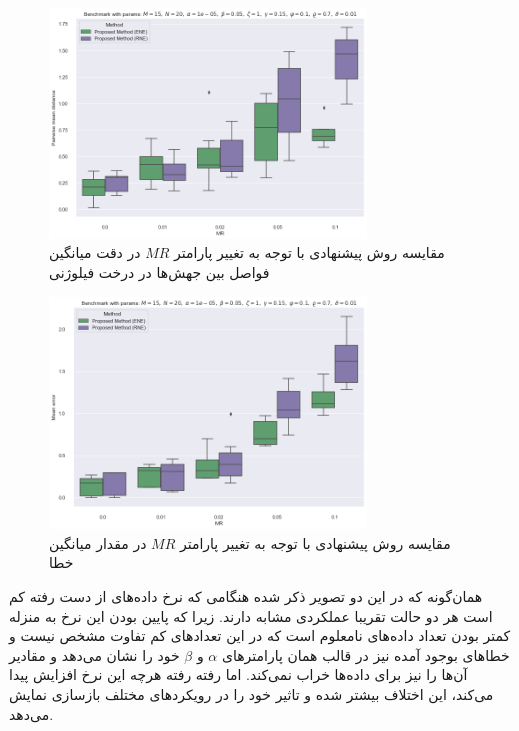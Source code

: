 \begin{figure}[!ht]
	\centering
	\includegraphics[width=0.75\textwidth]{img/chaps/er/comp_change_MR_pwd}
	\caption{‌مقایسه روش پیشنهادی با توجه به تغییر پارامتر $MR$ در دقت میانگین فواصل بین جهش‌ها در درخت فیلوژنی}
	\label{fig:ch_er:comp_change_MR_pwd}
\end{figure}
\begin{figure}[!ht]
	\centering
	\includegraphics[width=0.75\textwidth]{img/chaps/er/comp_change_MR_me}
	\caption{‌مقایسه روش پیشنهادی با توجه به تغییر پارامتر $MR$ در مقدار میانگین خطا}
	\label{fig:ch_er:comp_change_MR_me}
\end{figure}
\noindent
همان‌گونه که در این دو تصویر ذکر شده هنگامی که نرخ داده‌های از دست رفته کم است هر دو حالت تقریبا عملکردی مشابه دارند. زیرا که پایین بودن این نرخ به منزله کمتر بودن تعداد داده‌های نامعلوم است که در این تعدادهای کم تفاوت مشخص نیست و خطاهای بوجود آمده نیز در قالب همان پارامترهای $\alpha$ و $\beta$ خود را نشان می‌دهد و مقادیر آن‌ها را نیز برای داده‌ها خراب نمی‌کند. اما رفته رفته هرچه این نرخ افزایش پیدا می‌کند، این اختلاف بیشتر شده و تاثیر خود را در رویکردهای مختلف بازسازی نمایش می‌دهد.

